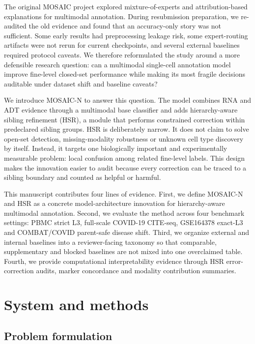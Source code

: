 \documentclass[unnumsec,webpdf,contemporary,large,numbered]{oup-authoring-template}
\begin{document}
The original MOSAIC project explored mixture-of-experts and attribution-based explanations for multimodal annotation. During resubmission preparation, we re-audited the old evidence and found that an accuracy-only story was not sufficient. Some early results had preprocessing leakage risk, some expert-routing artifacts were not rerun for current checkpoints, and several external baselines required protocol caveats. We therefore reformulated the study around a more defensible research question: can a multimodal single-cell annotation model improve fine-level closed-set performance while making its most fragile decisions auditable under dataset shift and baseline caveats?

We introduce MOSAIC-N to answer this question. The model combines RNA and ADT evidence through a multimodal base classifier and adds hierarchy-aware sibling refinement (HSR), a module that performs constrained correction within predeclared sibling groups. HSR is deliberately narrow. It does not claim to solve open-set detection, missing-modality robustness or unknown cell type discovery by itself. Instead, it targets one biologically important and experimentally measurable problem: local confusion among related fine-level labels. This design makes the innovation easier to audit because every correction can be traced to a sibling boundary and counted as helpful or harmful.

This manuscript contributes four lines of evidence. First, we define MOSAIC-N and HSR as a concrete model-architecture innovation for hierarchy-aware multimodal annotation. Second, we evaluate the method across four benchmark settings: PBMC strict L3, full-scale COVID-19 CITE-seq, GSE164378 exact-L3 and COMBAT/COVID parent-safe disease shift. Third, we organize external and internal baselines into a reviewer-facing taxonomy so that comparable, supplementary and blocked baselines are not mixed into one overclaimed table. Fourth, we provide computational interpretability evidence through HSR error-correction audits, marker concordance and modality contribution summaries.

\section{System and methods}

\subsection{Problem formulation}
\end{document}
